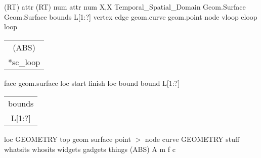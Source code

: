 \documentclass[11pt]{article}
\def\twolines#1#2{\vbox{\hbox{#1} \hbox{#2}}}
\renewcommand{\twolines}[2]{\begin{tabular}{c} #1\\{} #2\end{tabular}}
\begin{document}
(RT) attr
\stopmpxshipout
\mpxshipout%
(RT) num
\stopmpxshipout
\mpxshipout%
attr
\stopmpxshipout
\mpxshipout%
num
\stopmpxshipout
\mpxshipout%
X,X Temporal\_Spatial\_Domain
\stopmpxshipout
\mpxshipout%
Geom.Surface
\stopmpxshipout
\mpxshipout%
Geom.Surface
\stopmpxshipout
\mpxshipout%
bounds L[1:?]
\stopmpxshipout
\mpxshipout%
vertex
\stopmpxshipout
\mpxshipout%
edge
\stopmpxshipout
\mpxshipout%
geom.curve
\stopmpxshipout
\mpxshipout%
geom.point
\stopmpxshipout
\mpxshipout%
node
\stopmpxshipout
\mpxshipout%
vloop
\stopmpxshipout
\mpxshipout%
eloop
\stopmpxshipout
\mpxshipout%
loop
\stopmpxshipout
\mpxshipout%
\twolines{(ABS)}{*sc\_loop}
\stopmpxshipout
\mpxshipout%
face
\stopmpxshipout
\mpxshipout%
geom.surface
\stopmpxshipout
\mpxshipout%
loc
\stopmpxshipout
\mpxshipout%
start
\stopmpxshipout
\mpxshipout%
finish
\stopmpxshipout
\mpxshipout%
loc
\stopmpxshipout
\mpxshipout%
bound
\stopmpxshipout
\mpxshipout%
bound L[1:?]
\stopmpxshipout
{}
\stopmpxshipout
\mpxshipout%
\twolines{bounds}{L[1:?]}
\stopmpxshipout
\mpxshipout%
loc
\stopmpxshipout
\mpxshipout%
GEOMETRY
\stopmpxshipout
\mpxshipout%
top
\stopmpxshipout
\mpxshipout%
geom
\stopmpxshipout
\mpxshipout%
surface
\stopmpxshipout
\mpxshipout%
point $>$ node
\stopmpxshipout
\mpxshipout%
curve
\stopmpxshipout
\mpxshipout%
GEOMETRY
\stopmpxshipout
\mpxshipout%
stuff
\stopmpxshipout
\mpxshipout%
whatsits
\stopmpxshipout
\mpxshipout%
whosits
\stopmpxshipout
\mpxshipout%
widgets
\stopmpxshipout
\mpxshipout%
gadgets
\stopmpxshipout
\mpxshipout%
things
\stopmpxshipout
\mpxshipout%
(ABS) A
\stopmpxshipout
\mpxshipout%
m
\stopmpxshipout
\mpxshipout%
f
\stopmpxshipout
\mpxshipout%
c
\stopmpxshipout
\end{document}
